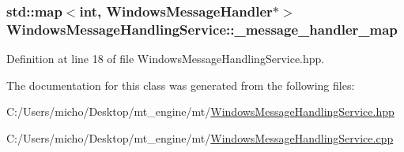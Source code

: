 \subsubsection[{\texorpdfstring{\+\_\+message\+\_\+handler\+\_\+map}{_message_handler_map}}]{\setlength{\rightskip}{0pt plus 5cm}std\+::map$<$int, {\bf Windows\+Message\+Handler}$\ast$$>$ Windows\+Message\+Handling\+Service\+::\+\_\+message\+\_\+handler\+\_\+map}\hypertarget{class_windows_message_handling_service_a3b880b8e67754a08a10fa7db150d11f5_a3b880b8e67754a08a10fa7db150d11f5}{}\label{class_windows_message_handling_service_a3b880b8e67754a08a10fa7db150d11f5_a3b880b8e67754a08a10fa7db150d11f5}


Definition at line 18 of file Windows\+Message\+Handling\+Service.\+hpp.



The documentation for this class was generated from the following files\+:\begin{DoxyCompactItemize}
\item 
C\+:/\+Users/micho/\+Desktop/mt\+\_\+engine/mt/\hyperlink{_windows_message_handling_service_8hpp}{Windows\+Message\+Handling\+Service.\+hpp}\item 
C\+:/\+Users/micho/\+Desktop/mt\+\_\+engine/mt/\hyperlink{_windows_message_handling_service_8cpp}{Windows\+Message\+Handling\+Service.\+cpp}\end{DoxyCompactItemize}
